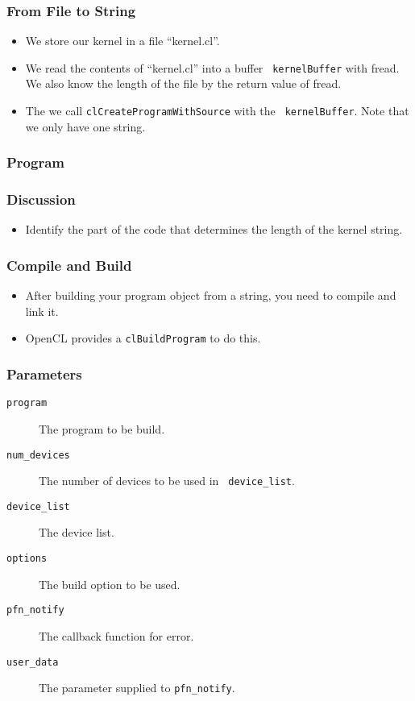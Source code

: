 \documentclass{beamer}
\begin{document}
\begin{frame}
  \frametitle{From File to String}
  \begin{itemize}
  \item We store our kernel in a file ``kernel.cl''.
  \item We read the contents of ``kernel.cl'' into a buffer {\tt
    kernelBuffer} with fread.  We also know the length of the file
    by the return value of fread.
  \item The we call {\tt clCreateProgramWithSource} with the {\tt
    kernelBuffer}.  Note that we only have one string.
  \end{itemize}
\end{frame}

\begin{frame}
  \frametitle{Program}
  \centerline{}
\end{frame}

\begin{frame}
  \frametitle{Discussion}
  \begin{itemize}
  \item Identify the part of the code that determines the length of
    the kernel string.
  \end{itemize}
\end{frame}

\begin{frame}
  \frametitle{Compile and Build}
  \begin{itemize}
  \item After building your program object from a string, you need to
    compile and link it.
  \item OpenCL provides a {\tt clBuildProgram} to do this.
  \end{itemize}
\end{frame}

\begin{frame}
\end{frame}

\begin{frame}
  \frametitle{Parameters}
  \begin{description}
  \item [\tt program] The program to be build.
  \item [\tt num\_devices] The number of devices to be used in {\tt
    device\_list}.
  \item [\tt device\_list] The device list.
  \item [\tt options] The build option to be used.
  \item [\tt pfn\_notify] The callback function for error.
  \item [\tt user\_data] The parameter supplied to {\tt pfn\_notify}.
  \end{description}
\end{frame}
\end{document}
